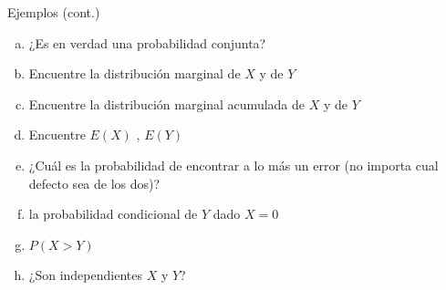 \documentclass[11pt]{beamer}
\begin{document}
\begin{frame}{Ejemplos (cont.)}
\begin{enumerate}[(a)]
\item ¿Es en verdad una probabilidad conjunta?
\item  Encuentre la distribución marginal de $X$ y de $Y$  
\item Encuentre la distribución marginal acumulada de $X$ y de $Y$ 
\item  Encuentre $E(X)$ , $E(Y)$ 
\item ¿Cuál es la probabilidad  de encontrar a lo más un error (no importa cual defecto sea de los dos)?
\item la probabilidad condicional de $Y$  dado $X=0$ 
\item $P(X>Y)$ 
\item ¿Son independientes $X$ y $Y$? 
\end{enumerate}



\end{frame}
\end{document}
